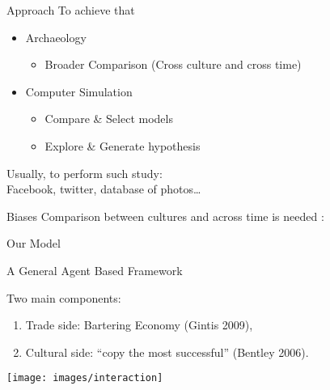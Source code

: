 \documentclass[12pt, notes=show]{beamer}
\begin{document}
\begin{frame}{Approach}
    To achieve that
    \begin{itemize}
	\item Archaeology
	    \begin{itemize}
		\item<2-> Broader Comparison (Cross culture and cross time)
	    \end{itemize}
	\item<3-> Computer Simulation
	    \begin{itemize}
		\item<4-> Compare \& Select models
		\item<5-> Explore \& Generate hypothesis
	    \end{itemize}
    \end{itemize}
Usually, to perform such study:\\
	Facebook, twitter, database of photos\dots\\
	    \vspace{.5cm}
	    \begin{alertblock}{Biases} 
	Comparison between cultures and across time is needed : \\
	    \begin{center}
	    \end{center}
	
    \end{alertblock}
\end{frame}

\begin{frame}
    \centering
    \Large
    Our Model
\end{frame}

\begin{frame}{A General Agent Based Framework }

     Two main components:
     \vfill
    \begin{enumerate}
	\item Trade side: Bartering Economy (Gintis 2009),
	\item Cultural side: ``copy the most successful'' (Bentley 2006).
    \end{enumerate}
    \begin{center}
	\texttt{[image: images/interaction]}	
    \end{center}
\end{frame}
	
\end{document}
